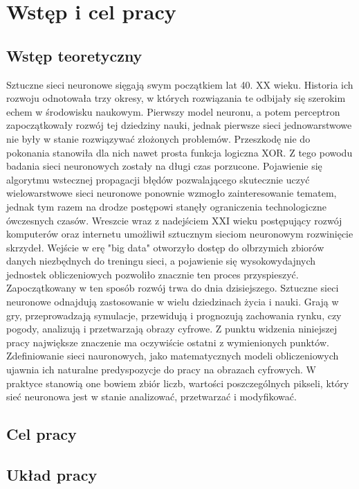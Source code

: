 \section{Wstęp i cel pracy}

  \subsection{Wstęp teoretyczny}
  \tab Sztuczne sieci neuronowe sięgają swym początkiem lat 40. XX wieku. Historia ich rozwoju odnotowała trzy okresy, w których rozwiązania te odbijały się szerokim echem w środowisku naukowym.
  \newline \tab Pierwszy model neuronu, a potem perceptron zapoczątkowały rozwój tej dziedziny nauki, jednak pierwsze sieci jednowarstwowe nie były w stanie rozwiązywać złożonych problemów. Przeszkodę nie do pokonania stanowiła dla nich nawet prosta funkcja logiczna XOR. Z tego powodu badania sieci neuronowych zostały na długi czas porzucone.
  \newline \tab Pojawienie się algorytmu wstecznej propagacji błędów pozwalającego skutecznie uczyć wielowarstwowe sieci neuronowe ponownie wzmogło zainteresowanie tematem, jednak tym razem na drodze postępowi stanęły ograniczenia technologiczne ówczesnych czasów.
  \newline \tab Wreszcie wraz z nadejściem XXI wieku postępujący rozwój komputerów oraz internetu umożliwił sztucznym sieciom neuronowym rozwinięcie skrzydeł. Wejście w erę "big data" otworzyło dostęp do olbrzymich zbiorów danych niezbędnych do treningu sieci, a pojawienie się wysokowydajnych jednostek obliczeniowych pozwoliło znacznie ten proces przyspieszyć.
  \newline \tab Zapoczątkowany w ten sposób rozwój trwa do dnia dzisiejszego. Sztuczne sieci neuronowe odnajdują zastosowanie w wielu dziedzinach życia i nauki. Grają w gry, przeprowadzają symulacje, przewidują i prognozują zachowania rynku, czy pogody, analizują i przetwarzają obrazy cyfrowe.
  \newline \tab Z punktu widzenia niniejszej pracy największe znaczenie ma oczywiście ostatni z wymienionych punktów. Zdefiniowanie sieci nauronowych, jako matematycznych modeli obliczeniowych ujawnia ich naturalne predyspozycje do pracy na obrazach cyfrowych. W praktyce stanowią one bowiem zbiór liczb, wartości poszczególnych pikseli, który sieć neuronowa jest w stanie analizować, przetwarzać i modyfikować.

  \subsection{Cel pracy}

  \subsection{Układ pracy}
